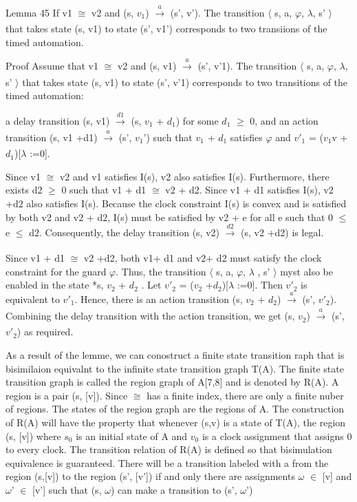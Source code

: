 Lemma 45
If v1 $\cong$ v2 and (s, $v_1$)  $\xrightarrow[]{a}$ (s', v'). The transition $\langle$ s, a, $\varphi$, $\lambda$, s' $\rangle$  that takes state (s, v1) to state (s', v1') corresponds to two transiions of the timed automation.

Proof
Assume that v1 $\cong$ v2 and (s, v1)  $\xrightarrow[]{a}$ (s', v'1). The transition $\langle$ s, a, $\varphi$, $\lambda$, s' $\rangle$ that takes state (s, v1) to state (s', v'1) corresponds to two transitions of the timed automation:

a delay transition (s, v1)  $\xrightarrow[]{d1}$ (s, $v_1$ + $d_1$) for some $d_1$ $\geq$ 0, and
an action transition   (s, v1 +d1)  $\xrightarrow[]{a}$ (s', $v_1$') such that $v_1$ + $d_1$ satisfies $\varphi$ and $v'_1$ = ($v_1$v + $d_1$)[$\lambda$ :=0].



Since v1 $\cong$ v2 and v1 satisfies I(s), v2 also satisfies I(s). Furthermore, there exists d2 $\geq$ 0 such that v1 + d1 $\cong$ v2 + d2. Since v1 + d1 satisfies I(s), v2 +d2 also satisfies I(s). Because the clock constraint I(s) is convex and is satisfied by both v2 and v2 + d2, I(s) must be satisfied by v2 + e for all e such that 0 $\leq$ e $\leq$ d2. Consequently, the delay transition (s, v2)  $\xrightarrow[]{d2}$ (s, v2 +d2) is legal.

Since v1 + d1 $\cong$ v2 +d2, both v1+ d1 and v2+ d2 must satisfy the clock constraint for the guard $\varphi$. Thus, the transition $\langle$ s, a, $\varphi$, $\lambda$ , s' $\rangle$ myst also be enabled in the state  *s, $v_2$ + $d_2$
. Let $v'_2$ = ($v_2$ +$d_2$)[$\lambda$ :=0]. Then $v'_2$ is equivalent to $v'_1$. Hence, there is an action transition (s, $v_2$ + $d_2$)  $\xrightarrow[]{a}$  (s', $v'_2$). Combining the delay transition with the action transition, we get (s, $v_2$)  $\xrightarrow[]{a}$ (s', $v'_2$) as required.

As a result of the lemme, we can conostruct a finite state transition raph that is  bisimilaion equivalnt to the infinite state transition graph T(A). The finite state transition graph is called the region graph of A[7,8] and is denoted by R(A). A region is a pair (s, [v]). Since $\cong$  has a finite index, there are only a finite nuber of regions. The states of the region graph are  the regions of A. The construction of R(A) will have the property that whenever (s,v) is a state of T(A), the region (s, [v]) where $s_0$ is an initial state of A and $v_0$ is a clock assignment that assigns 0 to every clock. The transition relation of R(A) is defined so that bisimulation equivalence is guaranteed. There will be a transition labeled with a from the region (s,[v]) to the region (s', [v']) if and only there are assignments $\omega$ $\in$ [v] and $\omega$' $\in$ [v'] such that (s, $\omega$) can make a transition to (s', $\omega$')

